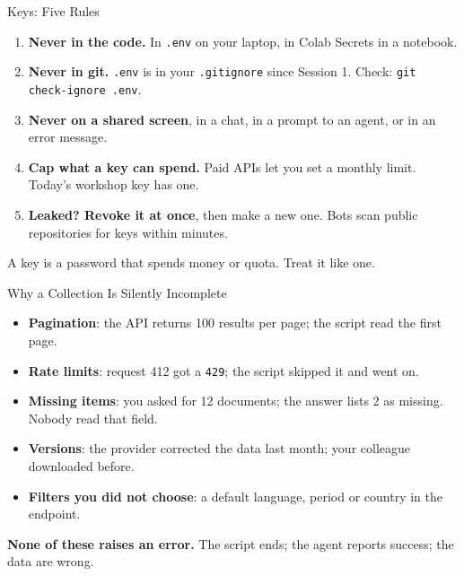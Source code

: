 \begin{frame}{Keys: Five Rules}

\begin{enumerate}
    \setlength{\itemsep}{7pt}
    \item \textbf{Never in the code.} In \texttt{.env} on your laptop, in Colab Secrets in a notebook.
    \item \textbf{Never in git.} \texttt{.env} is in your \texttt{.gitignore} since Session 1. Check: \texttt{git check-ignore .env}.
    \item \textbf{Never on a shared screen}, in a chat, in a prompt to an agent, or in an error message.
    \item \textbf{Cap what a key can spend.} Paid APIs let you set a monthly limit. Today's workshop key has one.
    \item \textbf{Leaked? Revoke it at once}, then make a new one. Bots scan public repositories for keys within minutes.
\end{enumerate}

\vspace{0.35cm}

\centering
{\small A key is a password that spends money or quota. Treat it like one.}

\end{frame}

\begin{frame}{Why a Collection Is Silently Incomplete}

\small
\begin{itemize}
    \setlength{\itemsep}{6pt}
    \item \textbf{Pagination}: the API returns 100 results per page; the script read the first page.
    \item \textbf{Rate limits}: request 412 got a \texttt{429}; the script skipped it and went on.
    \item \textbf{Missing items}: you asked for 12 documents; the answer lists 2 as missing. Nobody read that field.
    \item \textbf{Versions}: the provider corrected the data last month; your colleague downloaded before.
    \item \textbf{Filters you did not choose}: a default language, period or country in the endpoint.
\end{itemize}

\vspace{0.4cm}

\textbf{None of these raises an error.} The script ends; the agent reports success; the data are wrong.

\end{frame}

